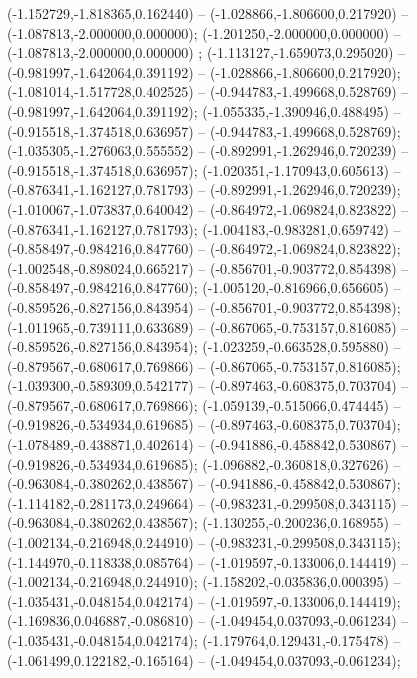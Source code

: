  (-1.152729,-1.818365,0.162440) -- (-1.028866,-1.806600,0.217920) -- (-1.087813,-2.000000,0.000000);
 (-1.201250,-2.000000,0.000000) -- (-1.087813,-2.000000,0.000000) ;
 (-1.113127,-1.659073,0.295020) -- (-0.981997,-1.642064,0.391192) -- (-1.028866,-1.806600,0.217920);
 (-1.081014,-1.517728,0.402525) -- (-0.944783,-1.499668,0.528769) -- (-0.981997,-1.642064,0.391192);
 (-1.055335,-1.390946,0.488495) -- (-0.915518,-1.374518,0.636957) -- (-0.944783,-1.499668,0.528769);
 (-1.035305,-1.276063,0.555552) -- (-0.892991,-1.262946,0.720239) -- (-0.915518,-1.374518,0.636957);
 (-1.020351,-1.170943,0.605613) -- (-0.876341,-1.162127,0.781793) -- (-0.892991,-1.262946,0.720239);
 (-1.010067,-1.073837,0.640042) -- (-0.864972,-1.069824,0.823822) -- (-0.876341,-1.162127,0.781793);
 (-1.004183,-0.983281,0.659742) -- (-0.858497,-0.984216,0.847760) -- (-0.864972,-1.069824,0.823822);
 (-1.002548,-0.898024,0.665217) -- (-0.856701,-0.903772,0.854398) -- (-0.858497,-0.984216,0.847760);
 (-1.005120,-0.816966,0.656605) -- (-0.859526,-0.827156,0.843954) -- (-0.856701,-0.903772,0.854398);
 (-1.011965,-0.739111,0.633689) -- (-0.867065,-0.753157,0.816085) -- (-0.859526,-0.827156,0.843954);
 (-1.023259,-0.663528,0.595880) -- (-0.879567,-0.680617,0.769866) -- (-0.867065,-0.753157,0.816085);
 (-1.039300,-0.589309,0.542177) -- (-0.897463,-0.608375,0.703704) -- (-0.879567,-0.680617,0.769866);
 (-1.059139,-0.515066,0.474445) -- (-0.919826,-0.534934,0.619685) -- (-0.897463,-0.608375,0.703704);
 (-1.078489,-0.438871,0.402614) -- (-0.941886,-0.458842,0.530867) -- (-0.919826,-0.534934,0.619685);
 (-1.096882,-0.360818,0.327626) -- (-0.963084,-0.380262,0.438567) -- (-0.941886,-0.458842,0.530867);
 (-1.114182,-0.281173,0.249664) -- (-0.983231,-0.299508,0.343115) -- (-0.963084,-0.380262,0.438567);
 (-1.130255,-0.200236,0.168955) -- (-1.002134,-0.216948,0.244910) -- (-0.983231,-0.299508,0.343115);
 (-1.144970,-0.118338,0.085764) -- (-1.019597,-0.133006,0.144419) -- (-1.002134,-0.216948,0.244910);
 (-1.158202,-0.035836,0.000395) -- (-1.035431,-0.048154,0.042174) -- (-1.019597,-0.133006,0.144419);
 (-1.169836,0.046887,-0.086810) -- (-1.049454,0.037093,-0.061234) -- (-1.035431,-0.048154,0.042174);
 (-1.179764,0.129431,-0.175478) -- (-1.061499,0.122182,-0.165164) -- (-1.049454,0.037093,-0.061234);
